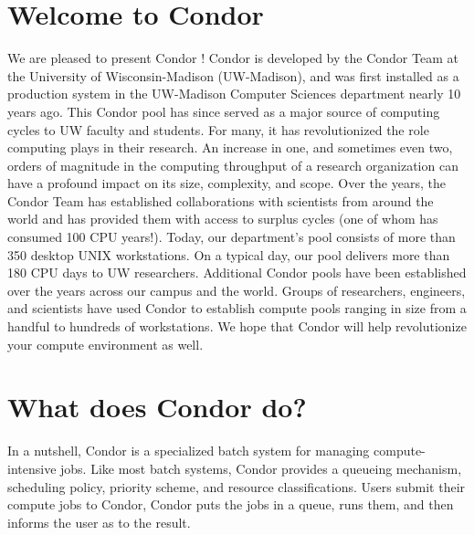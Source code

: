 \section{Welcome to Condor}  
%
% 
%

We are pleased to present Condor \VersionNotice! Condor is developed by
the Condor Team at the University of Wisconsin-Madison (UW-Madison), and
was first installed as a production system in the UW-Madison Computer
Sciences department nearly 10 years ago. This Condor pool has since
served as a major source of computing cycles to UW faculty and students.
For many, it has revolutionized the role computing plays in their
research. An increase in one, and sometimes even two, orders of
magnitude in the computing throughput of a research organization can
have a profound impact on its size, complexity, and scope. Over the
years, the Condor Team has established collaborations with scientists
from around the world and has provided them with access to surplus
cycles (one of whom has consumed 100 CPU years!). Today, our
department's pool consists of more than 350 desktop UNIX workstations.
On a typical day, our pool delivers more than 180 CPU days to UW
researchers. Additional Condor pools have been established over the
years across our campus and the world. Groups of researchers, engineers,
and scientists have used Condor to establish compute pools ranging in
size from a handful to hundreds of workstations. We hope that Condor
will help revolutionize your compute environment as well.


\section{What does Condor do?}


In a nutshell, Condor is a specialized batch system for managing
compute-intensive jobs.  Like most batch systems, Condor provides a
queueing mechanism, scheduling policy, priority scheme, and resource
classifications.  Users submit their compute jobs to Condor, Condor puts
the jobs in a queue, runs them, and then informs the user as to the
result.

